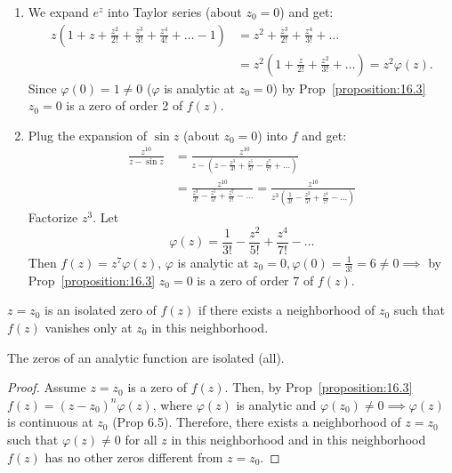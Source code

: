 \begin{soln}
\begin{enumerate}
    \item We expand $e^z$ into Taylor series (about $z_0 = 0$) and get: 
    \begin{align*}
         z(1 + z + \frac{z^2}{2!} + \frac{z^3}{3!} + \frac{z^4}{4!} + \dots - 1) & = z^2 + \frac{z^3}{2!} + \frac{z^4}{3!} + \dots \\ 
        &   = z^2(1 + \frac{z}{2!} + \frac{z^2}{3!} + \dots) = z^2 \varphi(z).
    \end{align*}
Since $\varphi(0) = 1 \neq 0$ ($\varphi$ is analytic at $z_0 = 0$) by Prop~\ref{proposition:16.3} $z_0 = 0$ is a zero of order 2 of $f(z)$.
\item Plug the expansion of $\sin z$ (about $z_0 = 0$) into $f$ and get:
\begin{align*}
     \frac{z^{10}}{z - \sin z} & = \frac{z^{10}}{z - (z - \frac{z^3}{3!} + \frac{z^5}{5!} - \frac{z^7}{7!} + \dots)} \\ 
     & = \frac{z^{10}}{\frac{z^3}{3!} - \frac{z^5}{5!} + \frac{z^7}{7!} - \dots} = \frac{z^{10}}{z^3(\frac{1}{3!} - \frac{z^2}{5!} + \frac{z^4}{7!} - \dots)} 
\end{align*}
Factorize $z^3$.
Let 
\[ \varphi(z) = \frac{1}{3!} - \frac{z^2}{5!} + \frac{z^4}{7!} - \dots\]
Then $f(z) = z^7 \varphi(z)$, $\varphi$ is analytic at $z_0 = 0, \varphi(0) = \frac{1}{3!} = 6 \neq 0 \implies$ by Prop~\ref{proposition:16.3} $z_0 = 0$ is a zero of order 7 of $f(z)$.
\end{enumerate}
\end{soln}

\begin{definition}\label{definition:16.4} $z = z_0$ is an isolated zero of $f(z)$ if there exists a neighborhood of $z_0$ such that $f(z)$ vanishes only at $z_0$ in this neighborhood.
\end{definition}
\begin{theorem}\label{theorem:16.1}
     The zeros of an analytic function are isolated (all).
\end{theorem}
\begin{proof}
Assume $z = z_0$ is a zero of $f(z)$. Then, by Prop~\ref{proposition:16.3} $f(z) = (z-z_0)^n \varphi(z)$, where $\varphi(z)$ is analytic and $\varphi(z_0) \neq 0 \implies \varphi(z)$ 
is continuous at $z_0$ (Prop 6.5). Therefore, there exists a neighborhood of $z = z_0$ such that $\varphi(z) \neq 0$ for all $z$ in this neighborhood and in this neighborhood $f(z)$ has no other zeros 
different from $z = z_0$.
\end{proof}

